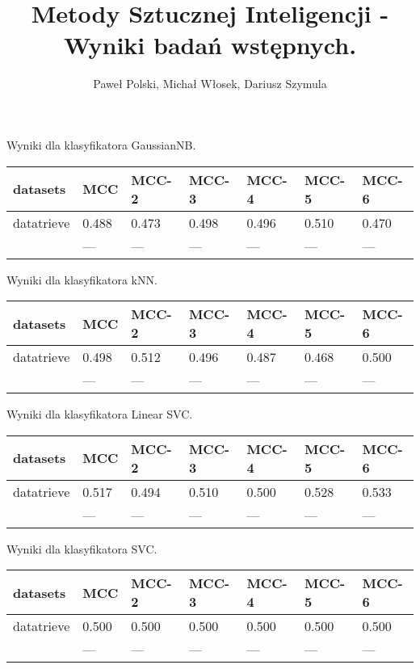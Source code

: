 \documentclass{article}
\begin{document}
\title{Metody Sztucznej Inteligencji - Wyniki badań wstępnych.}




\author{Paweł Polski, Michał Włosek, Dariusz Szymula}


\maketitle      
\begin{center}
\caption{Wyniki dla klasyfikatora GaussianNB.}\label{tab:my_label_GaussianNB}
\begin{tabular}{lllllll}
\hline
 datasets   & MCC   & MCC-2   & MCC-3   & MCC-4   & MCC-5   & MCC-6   \\
\hline
 datatrieve & 0.488 & 0.473   & 0.498   & 0.496   & 0.510   & 0.470   \\
            & ---   & ---     & ---     & ---     & ---     & ---     \\
\hline
\end{tabular}
\end{center}


\begin{center}
\caption{Wyniki dla klasyfikatora kNN.}\label{tab:my_label_kNN}
\begin{tabular}{lllllll}
\hline
 datasets   & MCC   & MCC-2   & MCC-3   & MCC-4   & MCC-5   & MCC-6   \\
\hline
 datatrieve & 0.498 & 0.512   & 0.496   & 0.487   & 0.468   & 0.500   \\
            & ---   & ---     & ---     & ---     & ---     & ---     \\
\hline
\end{tabular}
\end{center}

\begin{center}
\caption{Wyniki dla klasyfikatora Linear SVC.}\label{tab:my_label_LinearSVC}
\begin{tabular}{lllllll}
\hline
 datasets   & MCC   & MCC-2   & MCC-3   & MCC-4   & MCC-5   & MCC-6   \\
\hline
 datatrieve & 0.517 & 0.494   & 0.510   & 0.500   & 0.528   & 0.533   \\
            & ---   & ---     & ---     & ---     & ---     & ---     \\
\hline
\end{tabular}
\end{center}


\begin{center}
\caption{Wyniki dla klasyfikatora SVC.}\label{tab:my_label_SVC}
\begin{tabular}{lllllll}
\hline
 datasets   & MCC   & MCC-2   & MCC-3   & MCC-4   & MCC-5   & MCC-6   \\
\hline
 datatrieve & 0.500 & 0.500   & 0.500   & 0.500   & 0.500   & 0.500   \\
            & ---   & ---     & ---     & ---     & ---     & ---     \\
\hline
\end{tabular}
\end{center}
\end{document}
